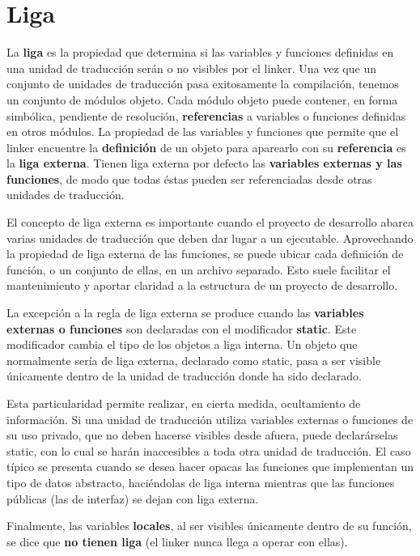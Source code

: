 \section{Liga}
La \textbf{liga} es la propiedad que determina si las variables y funciones definidas en una unidad de traducción serán o no visibles por el linker. Una vez que un conjunto de unidades de traducción pasa exitosamente la compilación, tenemos un
conjunto de módulos objeto. Cada módulo objeto puede contener, en forma simbólica, pendiente de
resolución, \textbf{referencias} a variables o funciones definidas en otros módulos.
La propiedad de las variables y funciones que permite que el linker encuentre la \textbf{definición} de un
objeto para aparearlo con su \textbf{referencia} es la \textbf{liga externa}. Tienen liga externa por defecto las \textbf{variables externas y
las funciones}, de modo que todas éstas pueden ser referenciadas desde otras unidades de traducción.

El concepto de liga externa es importante cuando el proyecto de desarrollo abarca varias unidades de
traducción que deben dar lugar a un ejecutable. Aprovechando la propiedad de liga externa de las
funciones, se puede ubicar cada definición de función, o un conjunto de ellas, en un archivo separado.
Esto suele facilitar el mantenimiento y aportar claridad a la estructura de un proyecto de desarrollo.

La excepción a la regla de liga externa se produce cuando las \textbf{variables externas o funciones} son
declaradas con el modificador \textbf{static}. Este modificador cambia el tipo de los objetos a liga interna. Un
objeto que normalmente sería de liga externa, declarado como static, pasa a ser visible únicamente
dentro de la unidad de traducción donde ha sido declarado.

Esta particularidad permite realizar, en cierta medida, ocultamiento de información. Si una unidad de
traducción utiliza variables externas o funciones de su uso privado, que no deben hacerse visibles
desde afuera, puede declarárselas static, con lo cual se harán inaccesibles a toda otra unidad de
traducción. El caso típico se presenta cuando se desea hacer opacas las funciones que implementan un
tipo de datos abstracto, haciéndolas de liga interna mientras que las funciones públicas (las de interfaz)
se dejan con liga externa.

Finalmente, las variables \textbf{locales}, al ser visibles únicamente dentro de su función, se dice que \textbf{no tienen liga} (el linker nunca llega a operar con ellas).


